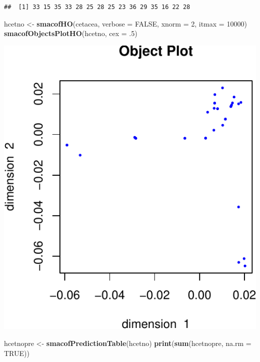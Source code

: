 \documentclass[
  12pt,
]{article}
\newenvironment{Shaded}{\begin{snugshade}}{\end{snugshade}}
\newcommand{\AttributeTok}[1]{\textcolor[rgb]{0.13,0.29,0.53}{#1}}
\newcommand{\ConstantTok}[1]{\textcolor[rgb]{0.56,0.35,0.01}{#1}}
\newcommand{\DecValTok}[1]{\textcolor[rgb]{0.00,0.00,0.81}{#1}}
\newcommand{\FunctionTok}[1]{\textcolor[rgb]{0.13,0.29,0.53}{\textbf{#1}}}
\newcommand{\NormalTok}[1]{#1}
\newcommand{\OtherTok}[1]{\textcolor[rgb]{0.56,0.35,0.01}{#1}}
\begin{document}
\begin{verbatim}
##  [1] 33 15 35 33 28 25 28 25 23 36 29 35 16 22 28
\end{verbatim}

\begin{Shaded}
\begin{Highlighting}[]
\NormalTok{hcetno }\OtherTok{\textless{}{-}} \FunctionTok{smacofHO}\NormalTok{(cetacea, }\AttributeTok{verbose =} \ConstantTok{FALSE}\NormalTok{, }\AttributeTok{xnorm =} \DecValTok{2}\NormalTok{, }\AttributeTok{itmax =} \DecValTok{10000}\NormalTok{)}
\FunctionTok{smacofObjectsPlotHO}\NormalTok{(hcetno, }\AttributeTok{cex =}\NormalTok{ .}\DecValTok{5}\NormalTok{)}
\end{Highlighting}
\end{Shaded}

\includegraphics{smacofHO_files/figure-latex/unnamed-chunk-2-1.pdf}

\begin{Shaded}
\begin{Highlighting}[]
\NormalTok{hcetnopre }\OtherTok{\textless{}{-}} \FunctionTok{smacofPredictionTable}\NormalTok{(hcetno)}
\FunctionTok{print}\NormalTok{(}\FunctionTok{sum}\NormalTok{(hcetnopre, }\AttributeTok{na.rm =} \ConstantTok{TRUE}\NormalTok{))}
\end{Highlighting}
\end{Shaded}
\end{document}
